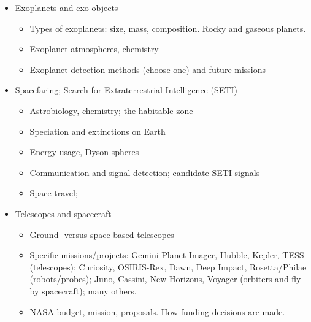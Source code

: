 \documentclass[11pt]{article}%
\begin{document}
\begin{itemize}[noitemsep]
    \item Exoplanets and exo-objects
        \begin{itemize}[noitemsep]
            \item Types of exoplanets: size, mass, composition.  Rocky and
                gaseous planets.
            \item Exoplanet atmospheres, chemistry
            \item Exoplanet detection methods (choose one) and future missions
        \end{itemize}
    \item Spacefaring; Search for Extraterrestrial Intelligence (SETI)
        \begin{itemize}[noitemsep]
            \item Astrobiology, chemistry; the habitable zone
            \item Speciation and extinctions on Earth
            \item Energy usage, Dyson spheres
            \item Communication and signal detection; candidate SETI signals
            \item Space travel; 
        \end{itemize}
    \item Telescopes and spacecraft
        \begin{itemize}[noitemsep]
            \item Ground- versus space-based telescopes
            \item Specific missions/projects: Gemini Planet Imager, Hubble,
                Kepler, TESS (telescopes); Curiosity, OSIRIS-Rex, Dawn, Deep
                Impact, Rosetta/Philae (robots/probes); Juno, Cassini, New
                Horizons, Voyager (orbiters and fly-by spacecraft); many
                others.
            \item NASA budget, mission, proposals.  How funding decisions
                are made.
        \end{itemize}
\end{itemize}
\end{document}
